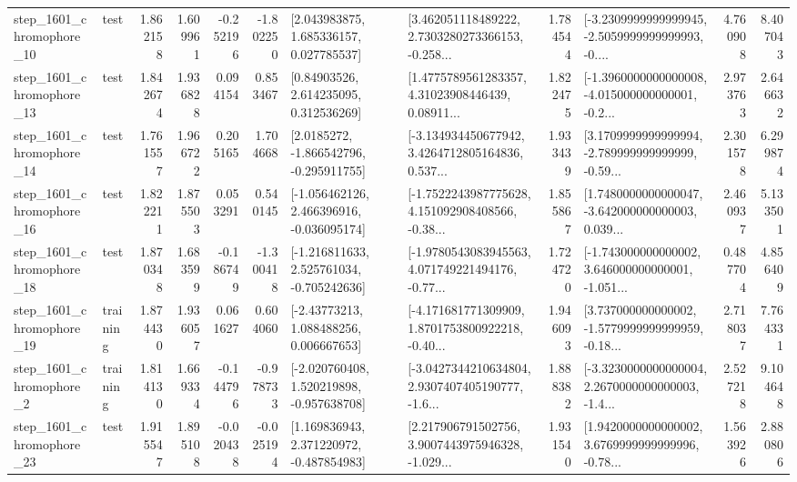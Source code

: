 \begin{tabular}{llrrrrllrlrr}
 step\_1601\_chromophore\_10 &      test &      1.862158 &    1.609961 &     -0.252196 & -1.802250 &     [2.043983875, 1.685336157, 0.027785537] &  [3.462051118489222, 2.7303280273366153, -0.258... &       1.784544 &  [-3.2309999999999945, -2.5059999999999993, -0.... &            4.760908 &          8.407043 \\
 step\_1601\_chromophore\_13 &      test &      1.842674 &    1.936828 &      0.094154 &  0.853467 &      [0.84903526, 2.614235095, 0.312536269] &  [1.4775789561283357, 4.31023908446439, 0.08911... &       1.822475 &  [-1.3960000000000008, -4.015000000000001, -0.2... &            2.973763 &          2.646632 \\
 step\_1601\_chromophore\_14 &      test &      1.761557 &    1.966722 &      0.205165 &  1.704668 &     [2.0185272, -1.866542796, -0.295911755] &  [-3.134934450677942, 3.4264712805164836, 0.537... &       1.933439 &  [3.1709999999999994, -2.789999999999999, -0.59... &            2.301578 &          6.299874 \\
 step\_1601\_chromophore\_16 &      test &      1.822211 &    1.875503 &      0.053291 &  0.540145 &   [-1.056462126, 2.466396916, -0.036095174] &  [-1.7522243987775628, 4.151092908408566, -0.38... &       1.855867 &  [1.7480000000000047, -3.642000000000003, 0.039... &            2.460937 &          5.133501 \\
 step\_1601\_chromophore\_18 &      test &      1.870348 &    1.683599 &     -0.186749 & -1.300418 &   [-1.216811633, 2.525761034, -0.705242636] &  [-1.9780543083945563, 4.071749221494176, -0.77... &       1.724720 &  [-1.743000000000002, 3.646000000000001, -1.051... &            0.487704 &          4.856409 \\
 step\_1601\_chromophore\_19 &  training &      1.874430 &    1.936057 &      0.061627 &  0.604060 &     [-2.43773213, 1.088488256, 0.006667653] &  [-4.171681771309909, 1.8701753800922218, -0.40... &       1.946093 &  [3.737000000000002, -1.5779999999999959, -0.18... &            2.718037 &          7.764331 \\
  step\_1601\_chromophore\_2 &  training &      1.814130 &    1.669334 &     -0.144796 & -0.978733 &   [-2.020760408, 1.520219898, -0.957638708] &  [-3.0427344210634804, 2.9307407405190777, -1.6... &       1.888382 &  [-3.3230000000000004, 2.2670000000000003, -1.4... &            2.527218 &          9.104648 \\
 step\_1601\_chromophore\_23 &      test &      1.915547 &    1.895108 &     -0.020438 & -0.025194 &    [1.169836943, 2.371220972, -0.487854983] &  [2.217906791502756, 3.9007443975946328, -1.029... &       1.931540 &  [1.9420000000000002, 3.6769999999999996, -0.78... &            1.563926 &          2.880806 \\

\end{tabular}
